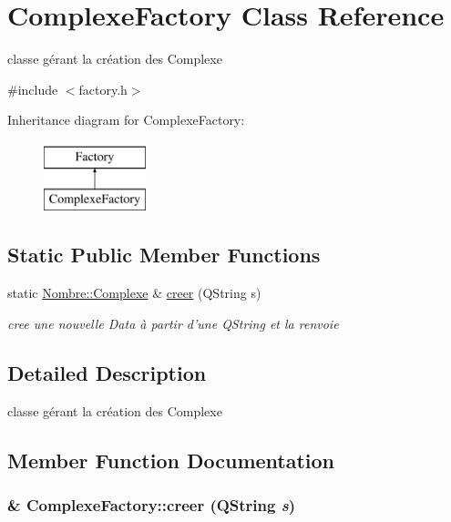 \hypertarget{classComplexeFactory}{
\section{ComplexeFactory Class Reference}
\label{classComplexeFactory}
}


classe gérant la création des Complexe  




{\ttfamily \#include $<$factory.h$>$}

Inheritance diagram for ComplexeFactory:\begin{figure}[H]
\begin{center}
\leavevmode
\includegraphics[height=2cm]{classComplexeFactory}
\end{center}
\end{figure}
\subsection*{Static Public Member Functions}
\begin{DoxyCompactItemize}
\item 
static \hyperlink{classNombre_1_1Complexe}{Nombre::Complexe} \& \hyperlink{classComplexeFactory_a751c417a005259673accfc2a60fd62fd}{creer} (QString s)
\begin{DoxyCompactList}\small\item\em cree une nouvelle Data à partir d'une QString et la renvoie \item\end{DoxyCompactList}\end{DoxyCompactItemize}


\subsection{Detailed Description}
classe gérant la création des Complexe 

\subsection{Member Function Documentation}
\hypertarget{classComplexeFactory_a751c417a005259673accfc2a60fd62fd}{
\subsubsection[{creer}]{ \& ComplexeFactory::creer (QString {\em s})}}
\label{classComplexeFactory_a751c417a005259673accfc2a60fd62fd}


